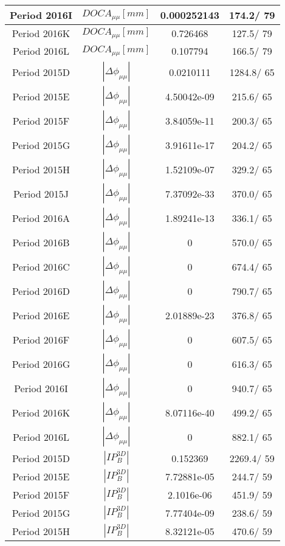 \documentclass{article}
\begin{document}
\begin{longtable}{c|c|c|c}
\hline
 Period 2016I & $DOCA_{\mu\mu} [mm]$ & 0.000252143 & 174.2/ 79\\
\hline
 Period 2016K & $DOCA_{\mu\mu} [mm]$ & 0.726468 & 127.5/ 79\\
\hline
 Period 2016L & $DOCA_{\mu\mu} [mm]$ & 0.107794 & 166.5/ 79\\
\hline
 Period 2015D & $|\Delta\phi_{\mu\mu}|$ & 0.0210111 & 1284.8/ 65\\
\hline
 Period 2015E & $|\Delta\phi_{\mu\mu}|$ & 4.50042e-09 & 215.6/ 65\\
\hline
 Period 2015F & $|\Delta\phi_{\mu\mu}|$ & 3.84059e-11 & 200.3/ 65\\
\hline
 Period 2015G & $|\Delta\phi_{\mu\mu}|$ & 3.91611e-17 & 204.2/ 65\\
\hline
 Period 2015H & $|\Delta\phi_{\mu\mu}|$ & 1.52109e-07 & 329.2/ 65\\
\hline
 Period 2015J & $|\Delta\phi_{\mu\mu}|$ & 7.37092e-33 & 370.0/ 65\\
\hline
 Period 2016A & $|\Delta\phi_{\mu\mu}|$ & 1.89241e-13 & 336.1/ 65\\
\hline
 Period 2016B & $|\Delta\phi_{\mu\mu}|$ & 0 & 570.0/ 65\\
\hline
 Period 2016C & $|\Delta\phi_{\mu\mu}|$ & 0 & 674.4/ 65\\
\hline
 Period 2016D & $|\Delta\phi_{\mu\mu}|$ & 0 & 790.7/ 65\\
\hline
 Period 2016E & $|\Delta\phi_{\mu\mu}|$ & 2.01889e-23 & 376.8/ 65\\
\hline
 Period 2016F & $|\Delta\phi_{\mu\mu}|$ & 0 & 607.5/ 65\\
\hline
 Period 2016G & $|\Delta\phi_{\mu\mu}|$ & 0 & 616.3/ 65\\
\hline
 Period 2016I & $|\Delta\phi_{\mu\mu}|$ & 0 & 940.7/ 65\\
\hline
 Period 2016K & $|\Delta\phi_{\mu\mu}|$ & 8.07116e-40 & 499.2/ 65\\
\hline
 Period 2016L & $|\Delta\phi_{\mu\mu}|$ & 0 & 882.1/ 65\\
\hline
 Period 2015D & $|IP_{B}^{3D}|$ & 0.152369 & 2269.4/ 59\\
\hline
 Period 2015E & $|IP_{B}^{3D}|$ & 7.72881e-05 & 244.7/ 59\\
\hline
 Period 2015F & $|IP_{B}^{3D}|$ & 2.1016e-06 & 451.9/ 59\\
\hline
 Period 2015G & $|IP_{B}^{3D}|$ & 7.77404e-09 & 238.6/ 59\\
\hline
 Period 2015H & $|IP_{B}^{3D}|$ & 8.32121e-05 & 470.6/ 59\\

\end{longtable}
\end{document}
